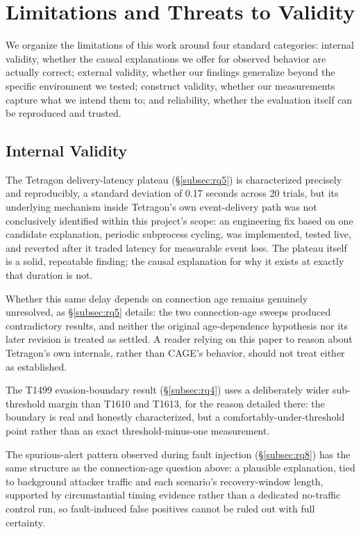 \documentclass{ieeeaccess}
\begin{document}
\section{Limitations and Threats to Validity}
\label{sec:limitations}

We organize the limitations of this work around four standard
categories: internal validity, whether the causal explanations we
offer for observed behavior are actually correct; external validity,
whether our findings generalize beyond the specific environment we
tested; construct validity, whether our measurements capture what we
intend them to; and reliability, whether the evaluation itself can be
reproduced and trusted.

\subsection{Internal Validity}
\label{subsec:internal-validity}

The Tetragon delivery-latency plateau (\S\ref{subsec:rq5}) is characterized
precisely and reproducibly, a standard deviation of 0.17 seconds
across 20 trials, but its underlying mechanism inside Tetragon's own
event-delivery path was not conclusively identified within this
project's scope: an engineering fix based on one candidate
explanation, periodic subprocess cycling, was implemented, tested
live, and reverted after it traded latency for measurable event loss.
The plateau itself is a solid, repeatable finding; the causal
explanation for why it exists at exactly that duration is not.

Whether this same delay depends on connection age remains genuinely
unresolved, as \S\ref{subsec:rq5} details: the two connection-age
sweeps produced contradictory results, and neither the original
age-dependence hypothesis nor its later revision is treated as
settled. A reader relying on this paper to reason about Tetragon's own
internals, rather than CAGE's behavior, should not treat either as
established.

The T1499 evasion-boundary result (\S\ref{subsec:rq4}) uses a
deliberately wider sub-threshold margin than T1610 and T1613, for the
reason detailed there: the boundary is real and honestly
characterized, but a comfortably-under-threshold point rather than an
exact threshold-minus-one measurement.

The spurious-alert pattern observed during fault injection
(\S\ref{subsec:rq8}) has the same structure as the connection-age
question above: a plausible explanation, tied to background attacker
traffic and each scenario's recovery-window length, supported by
circumstantial timing evidence rather than a dedicated no-traffic
control run, so fault-induced false positives cannot be ruled out with
full certainty.
\end{document}
